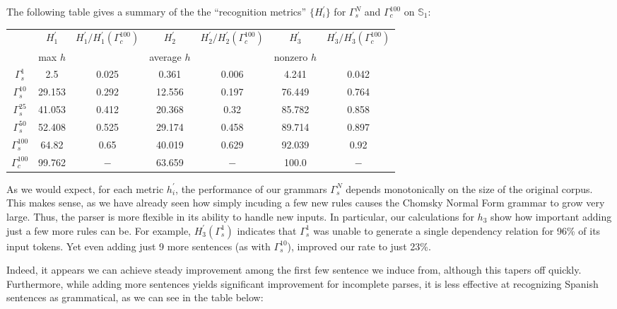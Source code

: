 \documentclass[paper=a4, fontsize=11pt]{scrartcl} %
\newcommand{\gcat}{\Gamma_{c}}
\newcommand{\gesp}{\Gamma_{s}}
\begin{document}
The following table gives a summary of the the ``recognition metrics'' $\{ H_i^\prime \}$ for $\gesp^N$ and $\gcat^{100}$ on $\mathbb{S}_1$:
\begin{center}
    \begin{tabular}{||c||cc|cc|cc||}
        \hline\hline
        & $H_1^\prime$ & $H_1^\prime/H_1^\prime(\gcat^{100})$ & $H_2^\prime$ & $H_2^\prime/H_2^\prime(\gcat^{100})$ & $H_3^\prime$ & $H_3^\prime/H_3^\prime(\gcat^{100})$ \\
        & max $h$ & & average $h$ & & nonzero $h$ & \\
        \hline\hline
        $\gesp^{1}$ & 2.5 & 0.025 & 0.361 & 0.006 & 4.241 & 0.042 \\ %
        $\gesp^{10}$ & 29.153 & 0.292 & 12.556 & 0.197 & 76.449 & 0.764 \\ %
        $\gesp^{25}$ & 41.053 & 0.412 & 20.368 & 0.32 & 85.782 & 0.858 \\ %
        $\gesp^{50}$ & 52.408 & 0.525 & 29.174 & 0.458 & 89.714 & 0.897 \\ %
        $\gesp^{100}$ & 64.82 & 0.65 & 40.019 & 0.629 & 92.039 & 0.92 \\ %
        \hline
		$\gcat^{100}$ & 99.762 & $-$ & 63.659 & $-$ & 100.0 & $-$ \\ %
        \hline\hline
    \end{tabular}
\end{center}

As we would expect, for each metric $h_i^\prime$, the performance of our grammars $\gesp^N$ depends monotonically on the size of the original corpus.  This makes sense, as we have already seen how simply incuding a few new rules causes the Chomsky Normal Form grammar to grow very large.  Thus, the parser is more flexible in its ability to handle new inputs.  In particular, our calculations for $h_3$ show how important adding just a few more rules can be.  For example, $H_3^\prime(\gesp^1)$ indicates that $\gesp^1$ was unable to generate a single dependency relation for 96\% of its input tokens.  Yet even adding just 9 more sentences (as with $\gesp^{10}$), improved our rate to just 23\%.

Indeed, it appears we can achieve steady improvement among the first few sentence we induce from, although this tapers off quickly.  Furthermore, while adding more sentences yields significant improvement for incomplete parses, it is less effective at recognizing Spanish sentences as grammatical, as we can see in the table below:
\end{document}
